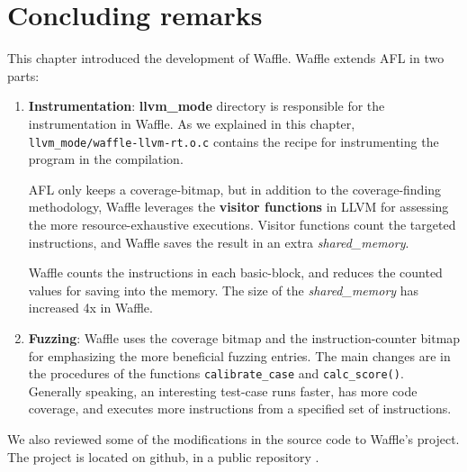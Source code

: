 \newpage
\section{Concluding remarks}

This chapter introduced the development of Waffle. Waffle extends AFL in two parts:

\begin{enumerate}
    \item \textbf{Instrumentation}: \textbf{llvm\_mode} directory is responsible for the instrumentation in Waffle. As we explained in this chapter, \texttt{llvm\_mode/waffle-llvm-rt.o.c} contains the recipe for instrumenting the program in the compilation.
    
    AFL only keeps a coverage-bitmap, but in addition to the coverage-finding methodology, Waffle leverages the \textbf{visitor functions} in LLVM for assessing the more resource-exhaustive executions. Visitor functions count the targeted instructions, and Waffle saves the result in an extra \textit{shared\_memory}.

    Waffle counts the instructions in each basic-block, and reduces the counted values for saving into the memory. The size of the \textit{shared\_memory} has increased 4x in Waffle.

    \item \textbf{Fuzzing}: Waffle uses the coverage bitmap and the instruction-counter bitmap for emphasizing the more beneficial fuzzing entries. The main changes are in the procedures of the functions \texttt{calibrate\_case} and \texttt{calc\_score()}. Generally speaking, an interesting test-case runs faster, has more code coverage, and executes more instructions from a specified set of instructions.
\end{enumerate}

We also reviewed some of the modifications in the source code to Waffle's project. The project is located on github, in a public repository \cite{wafl_git}.